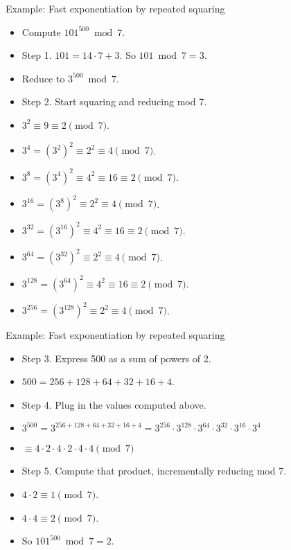 \documentclass{beamer}
\begin{document}
\begin{frame}{Example: Fast exponentiation by repeated squaring}
\begin{itemize}
  \item Compute $101^{500} \bmod 7$.
  \item Step 1. $101 = 14\cdot 7 + 3$. So $101\bmod 7 = 3$.
  \item Reduce to $3^{500} \bmod 7$.
  \item Step 2. Start squaring and reducing mod 7.
  \item $3^2 \equiv 9 \equiv 2 \pmod 7$.
  \item $3^4 = (3^2)^2 \equiv 2^2 \equiv 4 \pmod 7$.
  \item $3^{8} = (3^4)^2 \equiv 4^2 \equiv 16 \equiv 2 \pmod 7$.
  \item $3^{16} = (3^{8})^2 \equiv 2^2 \equiv 4 \pmod 7$.
  \item $3^{32} = (3^{16})^2 \equiv 4^2 \equiv 16 \equiv 2 \pmod 7$.
  \item $3^{64} = (3^{32})^2 \equiv 2^2 \equiv 4 \pmod 7$.
  \item $3^{128} = (3^{64})^2 \equiv 4^2 \equiv 16 \equiv 2 \pmod 7$.
  \item $3^{256} = (3^{128})^2 \equiv  2^2 \equiv 4 \pmod 7$.
\end{itemize}
\end{frame}

\begin{frame}{Example: Fast exponentiation by repeated squaring}
\begin{itemize}
  \item Step 3. Express 500 as a sum of powers of 2.
  \item $500 = 256+128+64+32+16+4$.
  \item Step 4. Plug in the values computed above.
  \item $3^{500} = 3^{256+128+64+32+16+4} = 3^{256} \cdot 3^{128} \cdot 3^{64} \cdot 3^{32} \cdot 3^{16} \cdot 3^4$
  \item $\equiv 4 \cdot 2 \cdot 4 \cdot 2 \cdot 4 \cdot 4 \pmod 7$
  \item Step 5. Compute that product, incrementally reducing mod 7.
  \item $4\cdot 2 \equiv 1 \pmod 7$.
  \item $4\cdot 4 \equiv 2 \pmod 7$.
  \item So $101^{500} \bmod 7 = 2$.
\end{itemize}
\end{frame}
\end{document}
